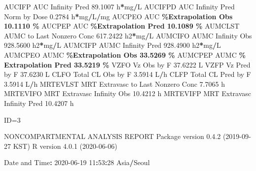 \documentclass[
  10pt,
]{krantz}
\makeatletter
\newenvironment{Shaded}{\begin{snugshade}}{\end{snugshade}}
\newcommand{\DecValTok}[1]{\textcolor[rgb]{0.00,0.00,0.81}{#1}}
\newcommand{\FloatTok}[1]{\textcolor[rgb]{0.00,0.00,0.81}{#1}}
\newcommand{\NormalTok}[1]{#1}
\newcommand{\OperatorTok}[1]{\textcolor[rgb]{0.81,0.36,0.00}{\textbf{#1}}}
\newcommand{\StringTok}[1]{\textcolor[rgb]{0.31,0.60,0.02}{#1}}
\newenvironment{kframe}{%
\medskip{}
\setlength{\fboxsep}{.8em}
 \def\at@end@of@kframe{}%
 \ifinner\ifhmode%
  \def\at@end@of@kframe{\end{minipage}}%
  \begin{minipage}{\columnwidth}%
 \fi\fi%
 \def\FrameCommand##1{\hskip\@totalleftmargin \hskip-\fboxsep
 \colorbox{shadecolor}{##1}\hskip-\fboxsep
     \hskip-\linewidth \hskip-\@totalleftmargin \hskip\columnwidth}%
 \MakeFramed {\advance\hsize-\width
   \@totalleftmargin\z@ \linewidth\hsize
   \@setminipage}}%
 {\par\unskip\endMakeFramed%
 \at@end@of@kframe}
\renewenvironment{Shaded}{\begin{kframe}}{\end{kframe}}
\makeatother
\begin{document}
\begin{Shaded}
\begin{Highlighting}[]
\NormalTok{AUCIFP     AUC Infinity Pred                              }\FloatTok{89.1007}\NormalTok{ h}\OperatorTok{*}\NormalTok{mg}\OperatorTok{/}\NormalTok{L}
\NormalTok{AUCIFPD    AUC Infinity Pred Norm by Dose                  }\FloatTok{0.2784}\NormalTok{ h}\OperatorTok{*}\NormalTok{mg}\OperatorTok{/}\NormalTok{L}\OperatorTok{/}\NormalTok{mg}
\NormalTok{AUCPEO     AUC }\OperatorTok{\%Extrapolation Obs                         10.1110 \%}
\NormalTok{AUCPEP     AUC }\OperatorTok{\%Extrapolation Pred                        10.1089 \%}
\NormalTok{AUMCLST    AUMC to Last Nonzero Conc                     }\FloatTok{617.2422}\NormalTok{ h2}\OperatorTok{*}\NormalTok{mg}\OperatorTok{/}\NormalTok{L}
\NormalTok{AUMCIFO    AUMC Infinity Obs                             }\FloatTok{928.5600}\NormalTok{ h2}\OperatorTok{*}\NormalTok{mg}\OperatorTok{/}\NormalTok{L}
\NormalTok{AUMCIFP    AUMC Infinity Pred                            }\FloatTok{928.4900}\NormalTok{ h2}\OperatorTok{*}\NormalTok{mg}\OperatorTok{/}\NormalTok{L}
\NormalTok{AUMCPEO    AUMC }\OperatorTok{\%Extrapolation Obs                        33.5269 \%}
\NormalTok{AUMCPEP    AUMC }\OperatorTok{\% Extrapolation Pred                      33.5219 \%}
\NormalTok{VZFO       Vz Obs by F                                    }\FloatTok{37.6222}\NormalTok{ L}
\NormalTok{VZFP       Vz Pred by F                                   }\FloatTok{37.6230}\NormalTok{ L}
\NormalTok{CLFO       Total CL Obs by F                               }\FloatTok{3.5914}\NormalTok{ L}\OperatorTok{/}\NormalTok{h}
\NormalTok{CLFP       Total CL Pred by F                              }\FloatTok{3.5914}\NormalTok{ L}\OperatorTok{/}\NormalTok{h}
\NormalTok{MRTEVLST   MRT Extravasc to Last Nonzero Conc              }\FloatTok{7.7065}\NormalTok{ h}
\NormalTok{MRTEVIFO   MRT Extravasc Infinity Obs                     }\FloatTok{10.4212}\NormalTok{ h}
\NormalTok{MRTEVIFP   MRT Extravasc Infinity Pred                    }\FloatTok{10.4207}\NormalTok{ h}





\NormalTok{ID=}\DecValTok{3}

\NormalTok{                        NONCOMPARTMENTAL ANALYSIS REPORT}
\NormalTok{                       Package version }\DecValTok{0}\NormalTok{.}\FloatTok{4.2}\NormalTok{ (}\DecValTok{2019{-}09{-}27}\NormalTok{ KST)}
\NormalTok{                          R version }\DecValTok{4}\NormalTok{.}\FloatTok{0.1}\NormalTok{ (}\DecValTok{2020{-}06{-}06}\NormalTok{)}

\NormalTok{Date and Time}\OperatorTok{:}\StringTok{ }\DecValTok{2020{-}06{-}19} \DecValTok{11}\OperatorTok{:}\DecValTok{53}\OperatorTok{:}\DecValTok{28}\NormalTok{ Asia}\OperatorTok{/}\NormalTok{Seoul}


\end{Highlighting}
\end{Shaded}
\end{document}
